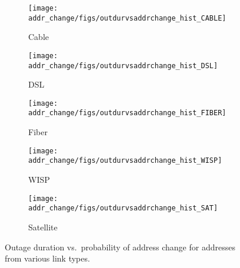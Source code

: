 
\begin{figure*}[t]

\begin{subfigure}[t]{0.19\linewidth}
\centering
\texttt{[image: addr\_change/figs/outdurvsaddrchange\_hist\_CABLE]}
\caption{
\label{fig:outdur_vs_addrchange_cable}
Cable}
\end{subfigure}
%
%
\begin{subfigure}[t]{0.19\linewidth}
\centering
\texttt{[image: addr\_change/figs/outdurvsaddrchange\_hist\_DSL]}
\caption{
\label{fig:outdur_vs_addrchange_dsl}
DSL}
\end{subfigure}
%
%
\begin{subfigure}[t]{0.19\linewidth}
\centering
\texttt{[image: addr\_change/figs/outdurvsaddrchange\_hist\_FIBER]}
\caption{
\label{fig:outdur_vs_addrchange_fiber}
Fiber}
\end{subfigure}
%
%
\begin{subfigure}[t]{0.19\linewidth}
\centering
\texttt{[image: addr\_change/figs/outdurvsaddrchange\_hist\_WISP]}
\caption{
\label{fig:outdur_vs_addrchange_wisp}
WISP}
\end{subfigure}
%
%
\begin{subfigure}[t]{0.19\linewidth}
\centering
\texttt{[image: addr\_change/figs/outdurvsaddrchange\_hist\_SAT]}
\caption{
\label{fig:outdur_vs_addrchange_sat}
Satellite}
\end{subfigure}
%
\caption[Outage duration vs.~probability of address change for addresses from
various link types]{
\label{fig:outdur_vs_addrchange}	
\figdone
Outage duration vs.~probability of address change for addresses from
various link types.}
%
\end{figure*}


